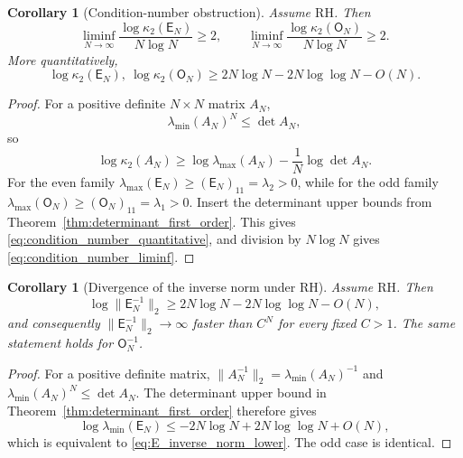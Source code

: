 \documentclass[11pt]{amsart}
\numberwithin{equation}{section}
\theoremstyle{plain}
\newtheorem{corollary}[theorem]{Corollary}
\theoremstyle{definition}
\theoremstyle{remark}
\newcommand{\RH}{\mathrm{RH}}
\newcommand{\E}{\mathsf E}
\newcommand{\Omat}{\mathsf O}
\begin{document}
\begin{corollary}[Condition-number obstruction]
\label{cor:condition_number_obstruction}
Assume $\RH$. Then
\begin{equation}
\boxed{
\liminf_{N\to\infty}
\frac{\log\kappa_2(\E_N)}{N\log N}\ge2,
\qquad
\liminf_{N\to\infty}
\frac{\log\kappa_2(\Omat_N)}{N\log N}\ge2.}
\label{eq:condition_number_liminf}
\end{equation}
More quantitatively,
\begin{equation}
\log\kappa_2(\E_N),\ \log\kappa_2(\Omat_N)
\ge
2N\log N-2N\log\log N-O(N).
\label{eq:condition_number_quantitative}
\end{equation}
\end{corollary}

\begin{proof}
For a positive definite $N\times N$ matrix $A_N$,
\begin{equation}
\lambda_{\min}(A_N)^N\le\det A_N,
\end{equation}
so
\begin{equation}
\log\kappa_2(A_N)
\ge \log\lambda_{\max}(A_N)-\frac1N\log\det A_N.
\label{eq:condition_from_det}
\end{equation}
For the even family $\lambda_{\max}(\E_N)\ge(\E_N)_{11}=\lambda_2>0$, while for the odd family $\lambda_{\max}(\Omat_N)\ge(\Omat_N)_{11}=\lambda_1>0$. Insert the determinant upper bounds from Theorem~\ref{thm:determinant_first_order}. This gives \eqref{eq:condition_number_quantitative}, and division by $N\log N$ gives \eqref{eq:condition_number_liminf}.
\end{proof}

\begin{corollary}[Divergence of the inverse norm under RH]
\label{cor:inverse_norm_divergence}
Assume \(\RH\).  Then
\begin{equation}
\boxed{
\log\|\E_N^{-1}\|_2
\ge
2N\log N-2N\log\log N-O(N),}
\label{eq:E_inverse_norm_lower}
\end{equation}
and consequently \(\|\E_N^{-1}\|_2\to\infty\) faster than \(C^N\) for every fixed
\(C>1\).  The same statement holds for \(\Omat_N^{-1}\).
\end{corollary}

\begin{proof}
For a positive definite matrix,
\(\|A_N^{-1}\|_2=\lambda_{\min}(A_N)^{-1}\) and
\(\lambda_{\min}(A_N)^N\le\det A_N\).  The determinant upper bound in
Theorem~\ref{thm:determinant_first_order} therefore gives
\[
\log\lambda_{\min}(\E_N)
\le
-2N\log N+2N\log\log N+O(N),
\]
which is equivalent to \eqref{eq:E_inverse_norm_lower}.  The odd case is identical.
\end{proof}
\end{document}
